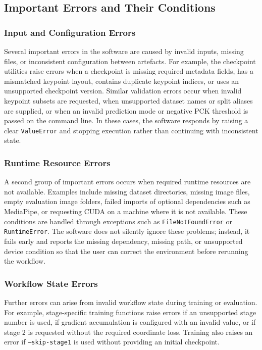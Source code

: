 ﻿\documentclass[11pt,a4paper]{article}
\begin{document}
\subsection{Important Errors and Their Conditions}

\subsubsection*{Input and Configuration Errors}

Several important errors in the software are caused by invalid inputs, missing
files, or inconsistent configuration between artefacts. For example, the
checkpoint utilities raise errors when a checkpoint is missing required
metadata fields, has a mismatched keypoint layout, contains duplicate keypoint
indices, or uses an unsupported checkpoint version. Similar validation errors
occur when invalid keypoint subsets are requested, when unsupported dataset
names or split aliases are supplied, or when an invalid prediction mode or
negative PCK threshold is passed on the command line.
In these cases, the software responds by raising a clear \texttt{ValueError}
and stopping execution rather than continuing with inconsistent state.

\subsubsection*{Runtime Resource Errors}

A second group of important errors occurs when required runtime resources are
not available. Examples include missing dataset directories, missing image
files, empty evaluation image folders, failed imports of optional dependencies
such as MediaPipe, or requesting CUDA on a machine where it is not available.
These conditions are handled through exceptions such as
\texttt{FileNotFoundError} or \texttt{RuntimeError}.
The software does not silently ignore these problems; instead, it fails early
and reports the missing dependency, missing path, or unsupported device
condition so that the user can correct the environment before rerunning the
workflow.

\subsubsection*{Workflow State Errors}

Further errors can arise from invalid workflow state during training or
evaluation. For example, stage-specific training functions raise errors if an
unsupported stage number is used, if gradient accumulation is configured with
an invalid value, or if stage 2 is requested without the required coordinate
loss. Training also raises an error if \texttt{--skip-stage1} is used without
providing an initial checkpoint.
\end{document}
